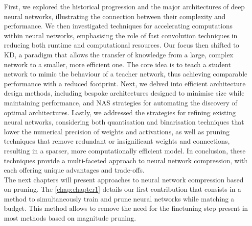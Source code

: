First, we explored the historical progression and the major architectures of
deep neural networks, illustrating the connection between their complexity and
performance. We then investigated techniques for accelerating computations
within neural networks, emphasising the role of fast convolution techniques in
reducing both runtime and computational resources. Our focus then shifted to
\acl{KD}, a paradigm that allows the transfer of knowledge from a large, complex
network to a smaller, more efficient one. The core idea is to teach a student
network to mimic the behaviour of a teacher network, thus achieving comparable
performance with a reduced footprint. Next, we delved into efficient
architecture design methods, including bespoke architectures designed to
minimise size while maintaining performance, and \acl{NAS} strategies for
automating the discovery of optimal architectures. Lastly, we addressed the
strategies for refining existing neural networks, considering both quantisation
and binarisation techniques that lower the numerical precision of weights and
activations, as well as pruning techniques that remove redundant or
insignificant weights and connections, resulting in a sparser, more
computationally efficient model. In conclusion, these techniques provide a
multi-faceted approach to neural network compression, with each offering unique
advantages and trade-offs.\\

The next chapters will present approaches to neural network compression based on
pruning. The \cref{chap:chapter1} details our first contribution that consists
in a method to simultaneously train and prune neural networks while matching a
budget. This method allows to remove the need for the finetuning step present in
most methods based on magnitude pruning.

